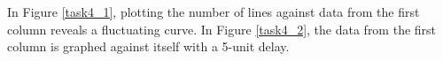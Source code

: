


In Figure \ref{task4_1}, plotting the number of lines against data from the first column reveals a fluctuating curve. In Figure \ref{task4_2}, the data from the first column is graphed against itself with a 5-unit delay.


